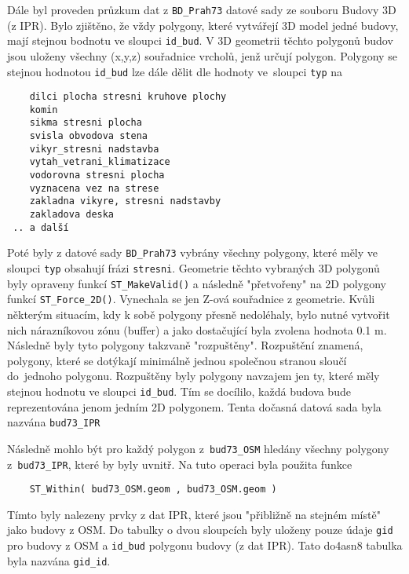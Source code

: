 Dále byl proveden průzkum dat z {\tt BD\_Prah73} datové sady ze souboru Budovy 3D (z IPR).
Bylo zjištěno, že vždy polygony, které vytvářejí 3D model jedné budovy,
mají stejnou bodnotu ve sloupci {\tt id\_bud}.
V 3D geometrii těchto polygonů budov jsou uloženy všechny (x,y,z) souřadnice
vrcholů, jenž určují polygon.
Polygony se stejnou hodnotou {\tt id\_bud} lze dále dělit dle hodnoty
ve~sloupci {\tt typ} na
\begin{verbatim}
    dilci plocha stresni kruhove plochy
    komin
    sikma stresni plocha
    svisla obvodova stena
    vikyr_stresni nadstavba
    vytah_vetrani_klimatizace
    vodorovna stresni plocha
    vyznacena vez na strese
    zakladna vikyre, stresni nadstavby
    zakladova deska
 .. a další
\end{verbatim}

Poté byly z datové sady {\tt BD\_Prah73} vybrány všechny polygony, které
měly ve sloupci {\tt typ} obsahují frázi {\tt stresni}.
Geometrie těchto vybraných 3D polygonů byly opraveny funkcí {\tt ST\_MakeValid()}
a následně "přetvořeny" na 2D polygony funkcí {\tt ST\_Force\_2D()}.
Vynechala se jen Z-ová souřadnice z geometrie.
Kvůli některým situacím, kdy k sobě polygony přesně nedoléhaly, bylo nutné
vytvořit nich nárazníkovou zónu (buffer) a jako dostačující byla zvolena hodnota 0.1 m.
Následně byly tyto polygony takzvaně "rozpuštěny". Rozpuštění znamená,
polygony, které se dotýkají minimálně jednou společnou stranou sloučí
do~jednoho polygonu.
Rozpuštěny byly polygony navzajem jen ty, které měly stejnou hodnotu ve sloupci 
{\tt id\_bud}.
Tím se docílilo, každá budova bude reprezentována jenom jedním 2D polygonem.
Tenta dočasná datová sada byla nazvána {\tt bud73\_IPR}


Následně mohlo být pro každý polygon z~{\tt bud73\_OSM} hledány
všechny polygony z~{\tt bud73\_IPR}, které by byly uvnitř.
Na tuto operaci byla použita funkce
\begin{verbatim}
    ST_Within( bud73_OSM.geom , bud73_OSM.geom )
\end{verbatim}
Tímto byly nalezeny prvky z dat IPR, které jsou "přibližně na stejném místě"
jako budovy z OSM. Do tabulky o dvou sloupcích byly uloženy pouze údaje
{\tt gid} pro budovy z OSM a {\tt id\_bud} polygonu budovy (z dat IPR).
Tato do4asn8 tabulka byla nazvána {\tt gid\_id}.


